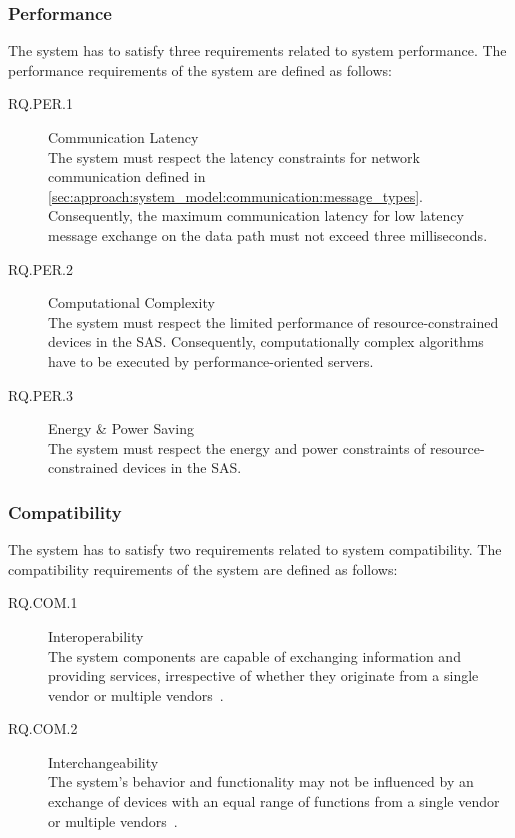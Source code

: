 \subsubsection{Performance}
The system has to satisfy three requirements related to system performance.
The performance requirements of the system are defined as follows:
\begin{description}
    \item[RQ.PER.1] Communication Latency\\
    The system must respect the latency constraints for network communication defined in \autoref{sec:approach:system_model:communication:message_types}.
    Consequently, the maximum communication latency for low latency message exchange on the data path must not exceed three milliseconds.
    \item[RQ.PER.2] Computational Complexity\\
    The system must respect the limited performance of resource-constrained devices in the SAS.
    Consequently, computationally complex algorithms have to be executed by performance-oriented servers.
    \item[RQ.PER.3] Energy \& Power Saving\\
    The system must respect the energy and power constraints of resource-constrained devices in the SAS.
\end{description}

\subsubsection{Compatibility}
The system has to satisfy two requirements related to system compatibility.
The compatibility requirements of the system are defined as follows:
\begin{description}
    \item[RQ.COM.1] Interoperability\\
    The system components are capable of exchanging information and providing services, irrespective of whether they originate from a single vendor or multiple vendors~\cite{IEC61850P5}.
    \item[RQ.COM.2] Interchangeability\\
    The system's behavior and functionality may not be influenced by an exchange of devices with an equal range of functions from a single vendor or multiple vendors~\cite{IEC61850P5}.
\end{description}

